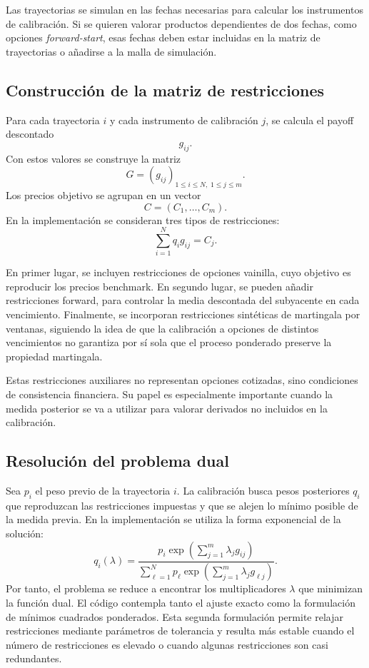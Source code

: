 Las trayectorias se simulan en las fechas necesarias para calcular los instrumentos de calibración. Si se quieren valorar productos dependientes de dos fechas, como opciones \textit{forward-start}, esas fechas deben estar incluidas en la matriz de trayectorias o añadirse a la malla de simulación.

\subsection{Construcción de la matriz de restricciones}

Para cada trayectoria \(i\) y cada instrumento de calibración \(j\), se calcula el payoff descontado
\[
g_{ij}.
\]
Con estos valores se construye la matriz
\[
G=(g_{ij})_{1\leq i\leq N,\;1\leq j\leq m}.
\]
Los precios objetivo se agrupan en un vector
\[
C=(C_1,\ldots,C_m).
\]
En la implementación se consideran tres tipos de restricciones:
\[
\sum_{i=1}^N q_i g_{ij}=C_j.
\]

En primer lugar, se incluyen restricciones de opciones vainilla, cuyo objetivo es reproducir los precios benchmark. En segundo lugar, se pueden añadir restricciones forward, para controlar la media descontada del subyacente en cada vencimiento. Finalmente, se incorporan restricciones sintéticas de martingala por ventanas, siguiendo la idea de que la calibración a opciones de distintos vencimientos no garantiza por sí sola que el proceso ponderado preserve la propiedad martingala.\medskip

Estas restricciones auxiliares no representan opciones cotizadas, sino condiciones de consistencia financiera. Su papel es especialmente importante cuando la medida posterior se va a utilizar para valorar derivados no incluidos en la calibración.

\subsection{Resolución del problema dual}

Sea \(p_i\) el peso previo de la trayectoria \(i\). La calibración busca pesos posteriores \(q_i\) que reproduzcan las restricciones impuestas y que se alejen lo mínimo posible de la medida previa. En la implementación se utiliza la forma exponencial de la solución:
\begin{equation}
\label{eq:impl_mre_weights}
q_i(\lambda)
=
\frac{
p_i\exp\left(\sum_{j=1}^m \lambda_j g_{ij}\right)
}{
\sum_{\ell=1}^N
p_\ell\exp\left(\sum_{j=1}^m \lambda_j g_{\ell j}\right)
}.
\end{equation}
Por tanto, el problema se reduce a encontrar los multiplicadores \(\lambda\) que minimizan la función dual. El código contempla tanto el ajuste exacto como la formulación de mínimos cuadrados ponderados. Esta segunda formulación permite relajar restricciones mediante parámetros de tolerancia y resulta más estable cuando el número de restricciones es elevado o cuando algunas restricciones son casi redundantes.\medskip

